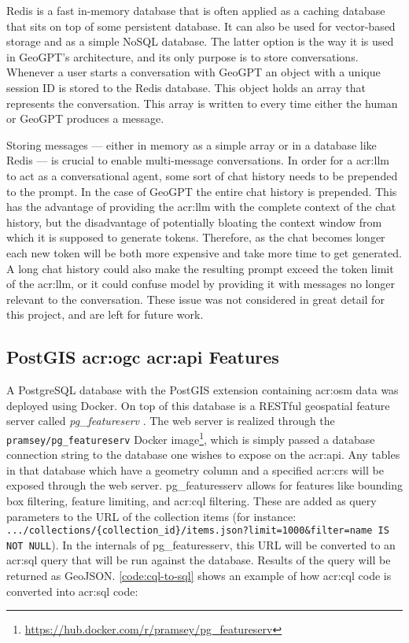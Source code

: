 Redis \citep{sanfilippoRedisRealtimeData2009} is a fast in-memory database that is often applied as a caching database that sits on top of some persistent database. It can also be used for vector-based storage and as a simple NoSQL database. The latter option is the way it is used in GeoGPT's architecture, and its only purpose is to store conversations. Whenever a user starts a conversation with GeoGPT an object with a unique session ID is stored to the Redis database. This object holds an array that represents the conversation. This array is written to every time either the human or GeoGPT produces a message.

Storing messages --- either in memory as a simple array or in a database like Redis --- is crucial to enable multi-message conversations. In order for a \gls{acr:llm} to act as a conversational agent, some sort of chat history needs to be prepended to the prompt. In the case of GeoGPT the entire chat history is prepended. This has the advantage of providing the \gls{acr:llm} with the complete context of the chat history, but the disadvantage of potentially bloating the context window from which it is supposed to generate tokens. Therefore, as the chat becomes longer each new token will be both more expensive and take more time to get generated. A long chat history could also make the resulting prompt exceed the token limit of the \gls{acr:llm}, or it could confuse model by providing it with messages no longer relevant to the conversation. These issue was not considered in great detail for this project, and are left for future work.

\subsection[PostGIS and OGC API Features]{PostGIS \acrshort{acr:ogc} \acrshort{acr:api} Features}

A PostgreSQL database with the PostGIS extension containing \gls{acr:osm} data was deployed using Docker. On top of this database is a RESTful geospatial feature server called \textit{pg\_featureserv} \citep{crunchydataCrunchyDataPg_featureserv2024}. The web server is realized through the \texttt{pramsey/pg\_featureserv} Docker image\footnote{\url{https://hub.docker.com/r/pramsey/pg_featureserv}}, which is simply passed a database connection string to the database one wishes to expose on the \acrshort{acr:api}. Any tables in that database which have a geometry column and a specified \gls{acr:crs} will be exposed through the web server. pg\_featuresserv allows for features like bounding box filtering, feature limiting, and \acrshort{acr:cql} filtering. These are added as query parameters to the URL of the collection items (for instance: \texttt{.../collections/\{collection\_id\}/items.json?limit=1000\&filter=name IS NOT NULL}). In the internals of pg\_featuresserv, this URL will be converted to an \acrshort{acr:sql} query that will be run against the database. Results of the query will be returned as GeoJSON. \autoref{code:cql-to-sql} shows an example of how \acrshort{acr:cql} code is converted into \acrshort{acr:sql} code:

